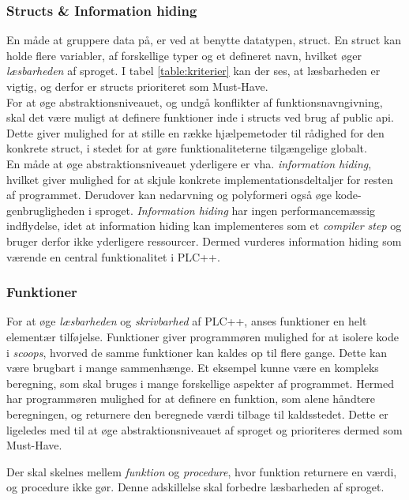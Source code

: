 \subsubsection{Structs \& Information hiding} 
En måde at gruppere data på, er ved at benytte datatypen, struct. En struct kan holde flere variabler, af forskellige typer og et defineret navn, hvilket øger \textit{læsbarheden} af sproget. I tabel \ref{table:kriterier} kan der ses, at læsbarheden er vigtig, og derfor er structs prioriteret som Must-Have. \\

\noindent For at øge abstraktionsniveauet, og undgå konflikter af funktionsnavngivning, skal det være muligt at definere funktioner inde i structs ved brug af public \gls{api}. Dette giver mulighed for at stille en række hjælpemetoder til rådighed for den konkrete struct, i stedet for at gøre funktionaliteterne tilgængelige globalt.\\ 

\noindent En måde at øge abstraktionsniveauet yderligere er vha. \textit{information hiding}, hvilket giver mulighed for at skjule konkrete implementationsdeltaljer for resten af programmet. Derudover kan nedarvning og polyformeri også øge kode-genbrugligheden i sproget. \textit{Information hiding} har ingen performancemæssig indflydelse, idet at information hiding kan implementeres som et \textit{compiler step} og bruger derfor ikke yderligere ressourcer. Dermed vurderes information hiding som værende en central funktionalitet i PLC++.

\subsubsection{Funktioner}
For at øge \textit{læsbarheden} og \textit{skrivbarhed} af PLC++, anses funktioner en helt elementær tilføjelse. Funktioner giver programmøren mulighed for at isolere kode i \textit{scoops}, hvorved de samme funktioner kan kaldes op til flere gange. Dette kan være brugbart i mange sammenhænge. Et eksempel kunne være en kompleks beregning, som skal bruges i mange forskellige aspekter af programmet. Hermed har programmøren mulighed for at definere en funktion, som alene håndtere beregningen, og returnere den beregnede værdi tilbage til kaldsstedet. Dette er ligeledes med til at øge abstraktionsniveauet af sproget og prioriteres dermed som Must-Have.

Der skal skelnes mellem \textit{funktion} og \textit{procedure}, hvor funktion returnere en værdi, og procedure ikke gør. Denne adskillelse skal forbedre læsbarheden af sproget. 

